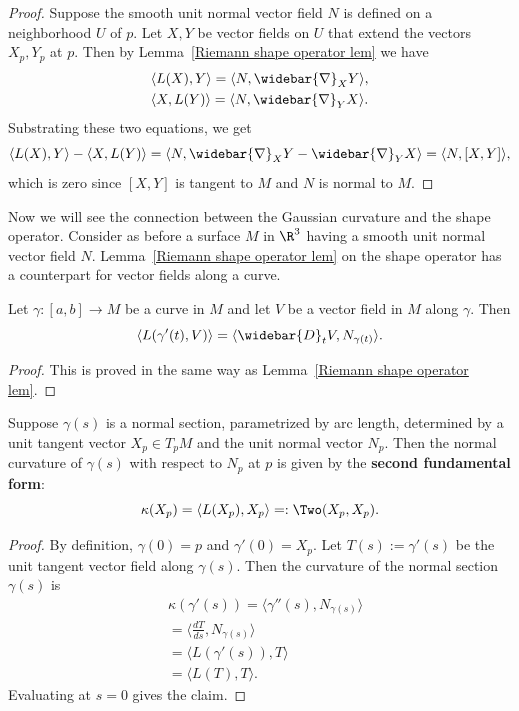 \begin{proof}
Suppose the smooth unit normal vector field $N$ is defined on a neighborhood $U$ of $p$. Let $X,Y$ be vector fields on $U$ that extend the vectors $X_p,Y_p$ at $p$. 
Then by Lemma~\ref{Riemann shape operator lem} we have
\begin{align*}
&\langle L(X),Y\rangle=\langle N,\widebar{\nabla}_{X}Y\rangle,\\
&\langle X,L(Y)\rangle=\langle N,\widebar{\nabla}_{Y}X\rangle.
\end{align*}
Substrating these two equations, we get
\[\langle L(X),Y\rangle-\langle X,L(Y)\rangle=\langle N,\widebar{\nabla}_{X}Y-\widebar{\nabla}_{Y}X\rangle=\langle N,[X,Y]\rangle,\]
which is zero since $[X,Y]$ is tangent to $M$ and $N$ is normal to $M$.
\end{proof}
Now we will see the connection between the Gaussian curvature and the shape operator. Consider as before a surface $M$ in $\R^3$ having a smooth unit normal vector 
field $N$. Lemma~\ref{Riemann shape operator lem} on the shape operator has a counterpart for vector fields along a curve.
\begin{proposition}\label{Riemann shape operator curve}
Let $\gamma:[a,b]\to M$ be a curve in $M$ and let $V$ be a vector field in $M$ along $\gamma$. Then
\[\langle L(\gamma'(t),V)\rangle=\langle\widebar{D}_tV,N_{\gamma(t)}\rangle.\]
\end{proposition}
\begin{proof}
This is proved in the same way as Lemma~\ref{Riemann shape operator lem}.
\end{proof}
\begin{proposition}
Suppose $\gamma(s)$ is a normal section, parametrized by arc length, determined by a unit tangent vector $X_p\in T_pM$ and the unit normal vector $N_p$. Then the 
normal curvature of $\gamma(s)$ with respect to $N_p$ at $p$ is given by the \textbf{second fundamental form}:
\[\kappa(X_p)=\langle L(X_p),X_p\rangle=:\Two(X_p,X_p).\]
\end{proposition}
\begin{proof}
By definition, $\gamma(0)=p$ and $\gamma'(0)=X_p$. Let $T(s):=\gamma'(s)$ be the unit tangent vector field along $\gamma(s)$. Then the curvature of the normal section 
$\gamma(s)$ is
\begin{align*}&
\kappa(\gamma'(s))=\langle\gamma''(s),N_{\gamma(s)}\rangle\\
&=\langle\frac{dT}{ds},N_{\gamma(s)}\rangle\\
&=\langle L(\gamma'(s)),T\rangle\\
&=\langle L(T),T\rangle.
\end{align*}
Evaluating at $s=0$ gives the claim.
\end{proof}
